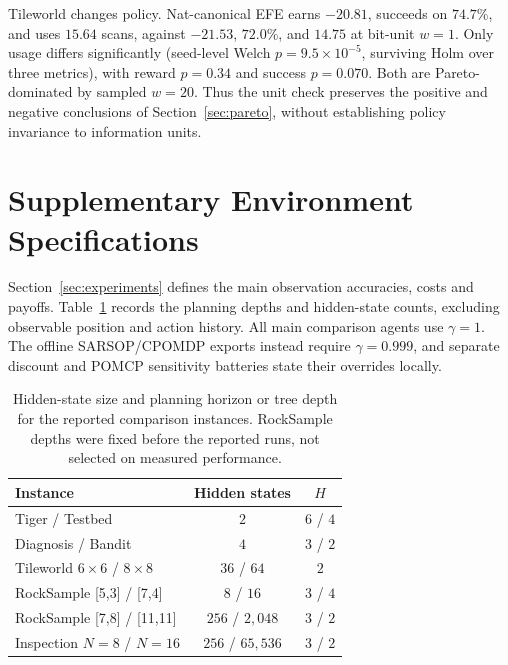 \documentclass[manuscript, screen, review]{jair}
\newcommand{\tablefontsize}{\fontsize{9}{11}\selectfont\setlength{\tabcolsep}{3pt}}
\newenvironment{tablebody}{\tablefontsize}{}
\begin{document}
Tileworld changes policy. Nat-canonical EFE earns $-20.81$, succeeds on $74.7\%$, and uses $15.64$ scans, against $-21.53$, $72.0\%$, and $14.75$ at bit-unit $w=1$. Only usage differs significantly (seed-level Welch $p=9.5\times10^{-5}$, surviving Holm over three metrics), with reward $p=0.34$ and success $p=0.070$. Both are Pareto-dominated by sampled $w=20$. Thus the unit check preserves the positive and negative conclusions of Section~\ref{sec:pareto}, without establishing policy invariance to information units.

\FloatBarrier

\section{Supplementary Environment Specifications}
\label{app:envs}

Section~\ref{sec:experiments} defines the main observation accuracies, costs and payoffs. Table~\ref{tab:environment_depths} records the planning depths and hidden-state counts, excluding observable position and action history. All main comparison agents use $\gamma=1$. The offline SARSOP/CPOMDP exports instead require $\gamma=0.999$, and separate discount and POMCP sensitivity batteries state their overrides locally.

\begin{table}[htbp]
\centering
\caption{Hidden-state size and planning horizon or tree depth for the reported comparison instances. RockSample depths were fixed before the reported runs, not selected on measured performance.}
\label{tab:environment_depths}
\begin{tablebody}
\begin{tabular}{lcc}
\toprule
Instance & Hidden states & $H$ \\
\midrule
Tiger / Testbed & $2$ & $6$ / $4$ \\
Diagnosis / Bandit & $4$ & $3$ / $2$ \\
Tileworld $6\times6$ / $8\times8$ & $36$ / $64$ & $2$ \\
RockSample [5,3] / [7,4] & $8$ / $16$ & $3$ / $4$ \\
RockSample [7,8] / [11,11] & $256$ / $2{,}048$ & $3$ / $2$ \\
Inspection $N=8$ / $N=16$ & $256$ / $65{,}536$ & $3$ / $2$ \\
\bottomrule
\end{tabular}
\end{tablebody}
\end{table}
\end{document}
